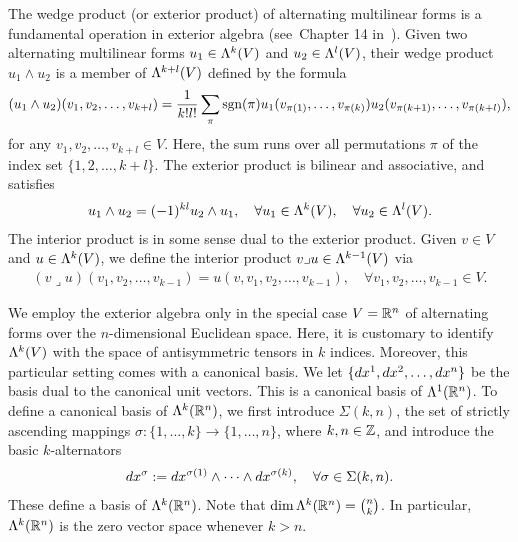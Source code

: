 \documentclass[10pt,a4paper]{article}
\begin{document}
The wedge product (or exterior product) of alternating multilinear forms is a fundamental operation in exterior algebra
(see~Chapter 14 in~\cite{lee2012smooth}). 
Given two alternating multilinear forms \( u_1 \in \Lambda^{k}(V) \) and \( u_2 \in \Lambda^{l}(V) \), 
their wedge product \( u_1 \wedge u_2 \) is a member of $\Lambda^{k+l}(V)$
defined by the formula 
\begin{gather*}
    (u_1 \wedge u_2)(v_1, v_2, \ldots, v_{k+l}) 
    = 
    \frac{1}{k! l!} 
    \sum_{ \pi } 
    \operatorname{sgn}(\pi) 
    u_1( v_{\pi(  1)}, \ldots, v_{\pi(k  )} ) 
    u_2( v_{\pi(k+1)}, \ldots, v_{\pi(k+l)} ),
\end{gather*}
for any \( v_1, v_2, \ldots, v_{k+l} \in V \).
Here, the sum runs over all permutations $\pi$ of the index set \(\{ 1, 2, \ldots, k+l \}\).
The exterior product is bilinear and associative, and satisfies 
\begin{align*}
    u_1 \wedge u_2 = (-1)^{kl} u_2 \wedge u_1,
    \quad 
    \forall u_1 \in \Lambda^{k}(V),
    \quad 
    \forall u_2 \in \Lambda^{l}(V).
\end{align*}
The interior product is in some sense dual to the exterior product. Given $v \in V$ and $u \in \Lambda^{k}(V)$, we define the interior product $v \lrcorner u \in \Lambda^{k-1}(V)$ via 
\begin{align*}
    (v \lrcorner u)( v_1, v_2, \ldots, v_{k-1} ) = u( v, v_1, v_2, \ldots, v_{k-1} ),
    \quad 
    \forall v_1, v_2, \ldots, v_{k-1} \in V.
\end{align*}

We employ the exterior algebra only in the special case $V = {\mathbb R}^{n}$ of alternating forms over the $n$-dimensional Euclidean space. 
Here, it is customary to identify $\Lambda^{k}(V)$ with the space of antisymmetric tensors in $k$ indices. 
Moreover, this particular setting comes with a canonical basis. 
We let \(\{dx^1, dx^2, \ldots, dx^{n}\}\) be the basis dual to the canonical unit vectors.
This is a canonical basis of $\Lambda^{1}({\mathbb R}^{n})$. 
To define a canonical basis of $\Lambda^{k}({\mathbb R}^{n})$, 
we first introduce $\Sigma(k,n)$, the set of strictly ascending mappings $\sigma : \{1,\dots,k\} \rightarrow \{1,\dots,n\}$, where $k, n \in {\mathbb Z}$, 
and introduce the basic $k$-alternators 
\begin{align*}
    dx^{\sigma} := dx^{\sigma(1)} \wedge \dots \wedge dx^{\sigma(k)}, 
    \quad 
    \forall \sigma \in \Sigma(k,n). 
\end{align*}
These define a basis of $\Lambda^{k}({\mathbb R}^{n})$.
Note that 
$\dim \Lambda^{k}({\mathbb R}^{n}) = \binom{n}{k}$. 
In particular, $\Lambda^{k}({\mathbb R}^{n})$ is the zero vector space whenever $k > n$.
\end{document}
